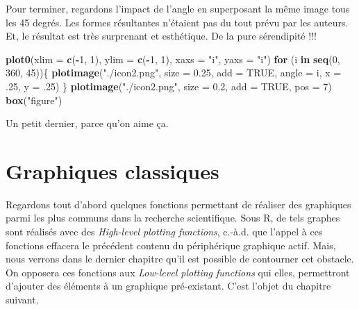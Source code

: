 \documentclass[]{article}
\newenvironment{Shaded}{\begin{snugshade}}{\end{snugshade}}
\newcommand{\ControlFlowTok}[1]{\textcolor[rgb]{0.13,0.29,0.53}{\textbf{#1}}}
\newcommand{\DataTypeTok}[1]{\textcolor[rgb]{0.13,0.29,0.53}{#1}}
\newcommand{\DecValTok}[1]{\textcolor[rgb]{0.00,0.00,0.81}{#1}}
\newcommand{\FloatTok}[1]{\textcolor[rgb]{0.00,0.00,0.81}{#1}}
\newcommand{\KeywordTok}[1]{\textcolor[rgb]{0.13,0.29,0.53}{\textbf{#1}}}
\newcommand{\NormalTok}[1]{#1}
\newcommand{\OperatorTok}[1]{\textcolor[rgb]{0.81,0.36,0.00}{\textbf{#1}}}
\newcommand{\OtherTok}[1]{\textcolor[rgb]{0.56,0.35,0.01}{#1}}
\newcommand{\StringTok}[1]{\textcolor[rgb]{0.31,0.60,0.02}{#1}}
\begin{document}
Pour terminer, regardons l'impact de l'angle en superposant la même image tous les 45 degrés. Les formes résultantes n'étaient pas du tout prévu par les auteurs. Et, le résultat est très surprenant et esthétique. De la pure sérendipité !!!

\begin{Shaded}
\begin{Highlighting}[]
\KeywordTok{plot0}\NormalTok{(}\DataTypeTok{xlim =} \KeywordTok{c}\NormalTok{(}\OperatorTok{-}\DecValTok{1}\NormalTok{, }\DecValTok{1}\NormalTok{), }\DataTypeTok{ylim =} \KeywordTok{c}\NormalTok{(}\OperatorTok{-}\DecValTok{1}\NormalTok{, }\DecValTok{1}\NormalTok{), }\DataTypeTok{xaxs =} \StringTok{"i"}\NormalTok{, }\DataTypeTok{yaxs =} \StringTok{"i"}\NormalTok{)}
\ControlFlowTok{for}\NormalTok{ (i }\ControlFlowTok{in} \KeywordTok{seq}\NormalTok{(}\DecValTok{0}\NormalTok{, }\DecValTok{360}\NormalTok{, }\DecValTok{45}\NormalTok{))\{}
\KeywordTok{plotimage}\NormalTok{(}\StringTok{"./icon2.png"}\NormalTok{, }\DataTypeTok{size =} \FloatTok{0.25}\NormalTok{, }\DataTypeTok{add =} \OtherTok{TRUE}\NormalTok{, }\DataTypeTok{angle =}\NormalTok{ i, }\DataTypeTok{x =} \FloatTok{.25}\NormalTok{, }\DataTypeTok{y =} \FloatTok{.25}\NormalTok{)}
\NormalTok{\}}
\KeywordTok{plotimage}\NormalTok{(}\StringTok{"./icon2.png"}\NormalTok{, }\DataTypeTok{size =} \FloatTok{0.2}\NormalTok{, }\DataTypeTok{add =} \OtherTok{TRUE}\NormalTok{, }\DataTypeTok{pos =} \DecValTok{7}\NormalTok{)}
\KeywordTok{box}\NormalTok{(}\StringTok{"figure"}\NormalTok{)}
\end{Highlighting}
\end{Shaded}

Un petit dernier, parce qu'on aime ça.

\hypertarget{graphiques-classiques}{%
\section{Graphiques classiques}\label{graphiques-classiques}}

Regardons tout d'abord quelques fonctions permettant de réaliser des graphiques parmi les plus communs dans la recherche scientifique. Sous R, de tels graphes sont réalisés avec des \emph{High-level plotting functions}, c.-à.d. que l'appel à ces fonctions effacera le précédent contenu du périphérique graphique actif. Mais, nous verrons dans le dernier chapitre qu'il est possible de contourner cet obstacle. On opposera ces fonctions aux \emph{Low-level plotting functions} qui elles, permettront d'ajouter des éléments à un graphique pré-existant. C'est l'objet du chapitre suivant.
\end{document}
